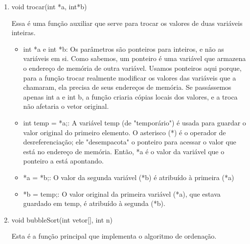 \documentclass{report}
\begin{document}
	\begin{enumerate}
		\item void trocar(int *a, int*b)
		
		Essa é uma função auxiliar que serve para trocar os valores de duas variáveis inteiras.
		
		\begin{itemize}
			\item int *a e int *b: Os parâmetros são ponteiros para inteiros, e não as variáveis em si. Como sabemos, um ponteiro é uma variável que armazena o endereço de memória de outra variável. Usamos ponteiros aqui porque, para a função trocar realmente modificar os valores das variáveis que a chamaram, ela precisa de seus endereços de memória. Se passássemos apenas int a e int b, a função criaria cópias locais dos valores, e a troca não afetaria o vetor original.
			\item int temp = *a;: A variável temp (de "temporário") é usada para guardar o valor original do primeiro elemento. O asterisco (*) é o operador de desreferenciação; ele "desempacota" o ponteiro para acessar o valor que está no endereço de memória. Então, *a é o valor da variável que o ponteiro a está apontando.
			\item *a = *b;: O valor da segunda variável (*b) é atribuído à primeira (*a)
			\item *b = temp;: O valor original da primeira variável (*a), que estava guardado em temp, é atribuído à segunda (*b).
			
		\end{itemize}
		
		\item void bubbleSort(int vetor[], int n)
		
		Esta é a função principal que implementa o algoritmo de ordenação.
		

\end{enumerate}
\end{document}
